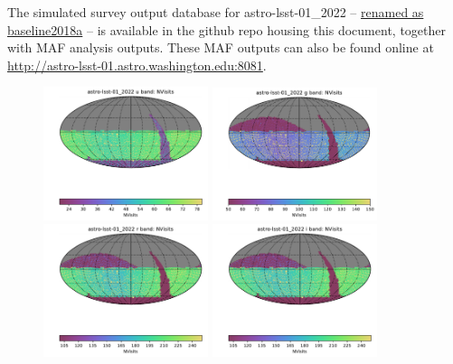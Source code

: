 \documentclass[DM,authoryear,toc]{lsstdoc}
\begin{document}
The simulated survey output database for astro-lsst-01\_2022 -- \underline{renamed as baseline2018a} -- is available in the github repo housing this document, together with MAF analysis outputs. These MAF outputs can also be found online at \url{http://astro-lsst-01.astro.washington.edu:8081}.


\clearpage
\clearpage

\begin{figure}[ht]
\centering
\includegraphics[width=0.43\textwidth]{figures/astro-lsst-01_2022_NVisits_u_band_HEAL_SkyMap}
\includegraphics[width=0.43\textwidth]{figures/astro-lsst-01_2022_NVisits_g_band_HEAL_SkyMap} \\
\includegraphics[width=0.43\textwidth]{figures/astro-lsst-01_2022_NVisits_r_band_HEAL_SkyMap}
\includegraphics[width=0.43\textwidth]{figures/astro-lsst-01_2022_NVisits_i_band_HEAL_SkyMap} \\

\end{figure}
\end{document}
